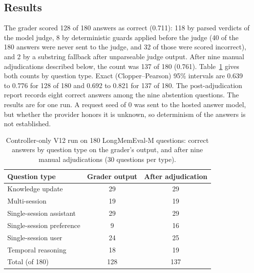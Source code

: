 \subsection{Results}
The grader scored 128 of 180 answers as correct (0.711): 118 by parsed verdicts of the model judge, 8 by deterministic guards applied before the judge (40 of the 180 answers were never sent to the judge, and 32 of those were scored incorrect), and 2 by a substring fallback after unparseable judge output. After nine manual adjudications described below, the count was 137 of 180 (0.761). Table~\ref{tab:lme} gives both counts by question type. Exact (Clopper--Pearson) 95\% intervals are 0.639 to 0.776 for 128 of 180 and 0.692 to 0.821 for 137 of 180. The post-adjudication report records eight correct answers among the nine abstention questions. The results are for one run. A request seed of 0 was sent to the hosted answer model, but whether the provider honors it is unknown, so determinism of the answers is not established.

\begin{table}[t]
\centering\small
\caption{Controller-only V12 run on 180 LongMemEval-M questions: correct answers by question type on the grader's output, and after nine manual adjudications (30 questions per type).}
\label{tab:lme}
\begin{tabular}{lcc}
\toprule
Question type & Grader output & After adjudication \\
\midrule
Knowledge update & 29 & 29 \\
Multi-session & 19 & 19 \\
Single-session assistant & 29 & 29 \\
Single-session preference & 9 & 16 \\
Single-session user & 24 & 25 \\
Temporal reasoning & 18 & 19 \\
\midrule
Total (of 180) & 128 & 137 \\
\bottomrule
\end{tabular}
\end{table}


